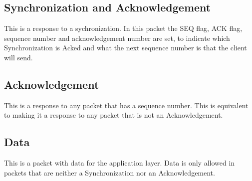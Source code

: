 \documentclass{report}
\begin{document}
    \subsection{Synchronization and Acknowledgement}
    This is a response to a sychronization. In this packet the SEQ flag, ACK flag, sequence number and acknowledgement number are set, to indicate which Synchronization is Acked and what the next sequence number is that the client will send.
    \subsection{Acknowledgement}
    This is a response to any packet that has a sequence number. This is equivalent to making it a response to any packet that is not an Acknowledgement.
    \subsection{Data}
    This is a packet with data for the application layer. Data is only allowed in packets that are neither a Synchronization nor an Acknowledgement.
\end{document}
